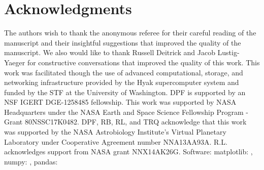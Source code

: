 \section{Acknowledgments}
The authors wish to thank the anonymous referee for their careful reading of the manuscript and their insightful suggestions that improved the quality of the manuscript.  We also would like to thank Russell Deitrick and Jacob Lustig-Yaeger for constructive conversations that improved the quality of this work.  This work was facilitated though the use of advanced computational, storage, and networking infrastructure provided by the Hyak supercomputer system and funded by the STF at the University of Washington. DPF is supported by an NSF IGERT DGE-1258485 fellowship.  This work was supported by NASA Headquarters under the NASA Earth and Space Science Fellowship Program - Grant 80NSSC17K0482.  DPF, RB, RL, and TRQ acknowledge that this work was supported by the NASA Astrobiology Institute's Virtual Planetary Laboratory under Cooperative Agreement number NNA13AA93A. R.L. acknowledges support from NASA grant NNX14AK26G. Software: matplotlib: \citet{Hunter2007}, numpy: \citet{vanderWalt2011}, pandas: \citet{Mckinney2010}





